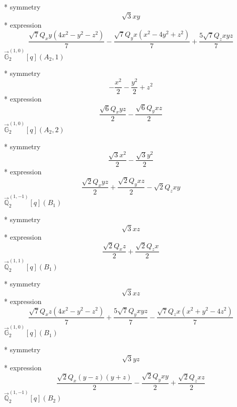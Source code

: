 \documentclass[fleqn,8pt]{jsarticle}
\begin{document}
\noindent\quad ** symmetry
\begin{dmath*}
\sqrt{3} x y
\end{dmath*}
\noindent\quad ** expression
\begin{dmath*}
\frac{\sqrt{7} Q_{x} y \left(4 x^{2} - y^{2} - z^{2}\right)}{7} - \frac{\sqrt{7} Q_{y} x \left(x^{2} - 4 y^{2} + z^{2}\right)}{7} + \frac{5 \sqrt{7} Q_{z} x y z}{7}
\end{dmath*}
\noindent\quad $\vec{\mathbb{G}}_{2}^{(1,0)}[q](A_{2},1)$

\noindent\quad ** symmetry
\begin{dmath*}
- \frac{x^{2}}{2} - \frac{y^{2}}{2} + z^{2}
\end{dmath*}
\noindent\quad ** expression
\begin{dmath*}
\frac{\sqrt{6} Q_{x} y z}{2} - \frac{\sqrt{6} Q_{y} x z}{2}
\end{dmath*}
\noindent\quad $\vec{\mathbb{G}}_{2}^{(1,0)}[q](A_{2},2)$

\noindent\quad ** symmetry
\begin{dmath*}
\frac{\sqrt{3} x^{2}}{2} - \frac{\sqrt{3} y^{2}}{2}
\end{dmath*}
\noindent\quad ** expression
\begin{dmath*}
\frac{\sqrt{2} Q_{x} y z}{2} + \frac{\sqrt{2} Q_{y} x z}{2} - \sqrt{2} Q_{z} x y
\end{dmath*}
\noindent\quad $\vec{\mathbb{Q}}_{2}^{(1,-1)}[q](B_{1})$

\noindent\quad ** symmetry
\begin{dmath*}
\sqrt{3} x z
\end{dmath*}
\noindent\quad ** expression
\begin{dmath*}
\frac{\sqrt{2} Q_{x} z}{2} + \frac{\sqrt{2} Q_{z} x}{2}
\end{dmath*}
\noindent\quad $\vec{\mathbb{Q}}_{2}^{(1,1)}[q](B_{1})$

\noindent\quad ** symmetry
\begin{dmath*}
\sqrt{3} x z
\end{dmath*}
\noindent\quad ** expression
\begin{dmath*}
\frac{\sqrt{7} Q_{x} z \left(4 x^{2} - y^{2} - z^{2}\right)}{7} + \frac{5 \sqrt{7} Q_{y} x y z}{7} - \frac{\sqrt{7} Q_{z} x \left(x^{2} + y^{2} - 4 z^{2}\right)}{7}
\end{dmath*}
\noindent\quad $\vec{\mathbb{G}}_{2}^{(1,0)}[q](B_{1})$

\noindent\quad ** symmetry
\begin{dmath*}
\sqrt{3} y z
\end{dmath*}
\noindent\quad ** expression
\begin{dmath*}
\frac{\sqrt{2} Q_{x} \left(y - z\right) \left(y + z\right)}{2} - \frac{\sqrt{2} Q_{y} x y}{2} + \frac{\sqrt{2} Q_{z} x z}{2}
\end{dmath*}
\noindent\quad $\vec{\mathbb{Q}}_{2}^{(1,-1)}[q](B_{2})$
\end{document}
